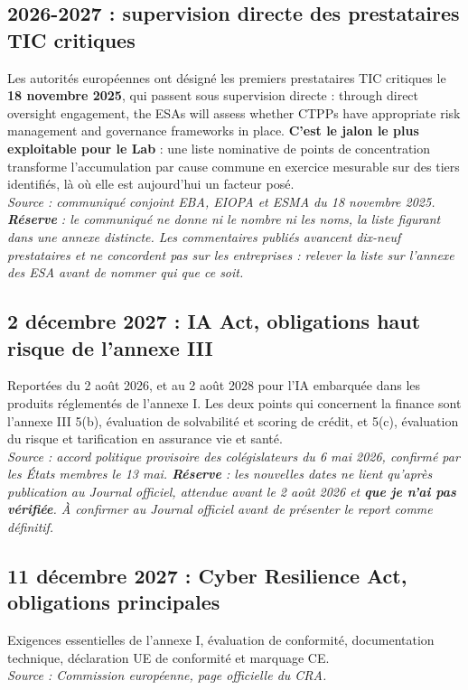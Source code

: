 \documentclass[11pt,a4paper]{article}
\newcommand{\src}[1]{{\footnotesize\itshape\textcolor{bleu}{Source : #1}}}
\begin{document}
\subsection{2026-2027 : supervision directe des prestataires TIC critiques}
Les autorités européennes ont désigné les premiers prestataires TIC critiques le
\textbf{18 novembre 2025}, qui passent sous supervision directe : \og{}through direct oversight
engagement, the ESAs will assess whether CTPPs have appropriate risk management and governance
frameworks in place\fg{}. \textbf{C'est le jalon le plus exploitable pour le Lab} : une liste
nominative de points de concentration transforme l'accumulation par cause commune en exercice
mesurable sur des tiers identifiés, là où elle est aujourd'hui un facteur posé. \\
\src{communiqué conjoint EBA, EIOPA et ESMA du 18 novembre 2025. \textbf{Réserve} : le
communiqué ne donne ni le nombre ni les noms, la liste figurant dans une annexe distincte. Les
commentaires publiés avancent dix-neuf prestataires et ne concordent pas sur les entreprises :
relever la liste sur l'annexe des ESA avant de nommer qui que ce soit.}

\subsection{2 décembre 2027 : IA Act, obligations haut risque de l'annexe III}
Reportées du 2 août 2026, et au 2 août 2028 pour l'IA embarquée dans les produits réglementés de
l'annexe I. Les deux points qui concernent la finance sont l'annexe III 5(b), évaluation de
solvabilité et scoring de crédit, et 5(c), évaluation du risque et tarification en assurance vie
et santé. \\
\src{accord politique provisoire des colégislateurs du 6 mai 2026, confirmé par les États
membres le 13 mai. \textbf{Réserve} : les nouvelles dates ne lient qu'après publication au
Journal officiel, attendue avant le 2 août 2026 et \textbf{que je n'ai pas vérifiée}. À
confirmer au Journal officiel avant de présenter le report comme définitif.}

\subsection{11 décembre 2027 : Cyber Resilience Act, obligations principales}
Exigences essentielles de l'annexe I, évaluation de conformité, documentation technique,
déclaration UE de conformité et marquage CE. \\
\src{Commission européenne, page officielle du CRA.}
\end{document}
